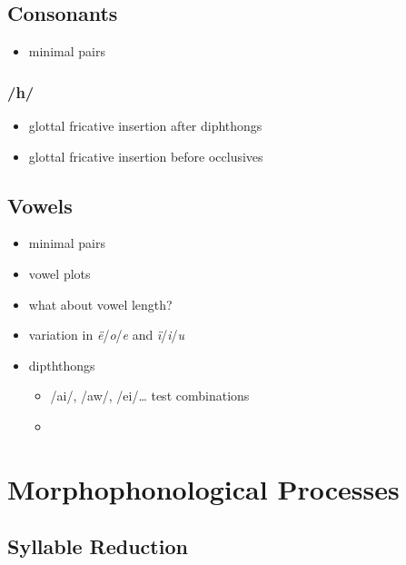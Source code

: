 \documentclass{memoir}
\begin{document}
\subsection{\texorpdfstring{Consonants
\label{sec:consonants}}{Consonants }}

\begin{itemize}
\tightlist
\item
  minimal pairs
\end{itemize}

\subsubsection{/h/}

\begin{itemize}
\tightlist
\item
  glottal fricative insertion after diphthongs
\item
  glottal fricative insertion before occlusives
\end{itemize}

\subsection{\texorpdfstring{Vowels \label{sec:vowels}}{Vowels }}

\begin{itemize}
\item
  minimal pairs
\item
  vowel plots
\item
  what about vowel length?
\item
  variation in \emph{ë}/\emph{o}/\emph{e} and \emph{ï}/\emph{i}/\emph{u}
\item
  dipththongs

  \begin{itemize}
  \tightlist
  \item
    /ai/, /aw/, /ei/\ldots{} test combinations
  \item
  \end{itemize}
\end{itemize}

\section{\texorpdfstring{Morphophonological Processes
\label{sec:morphophono}}{Morphophonological Processes }}

\subsection{\texorpdfstring{Syllable Reduction
\label{sec:sylred}}{Syllable Reduction }}
\end{document}
